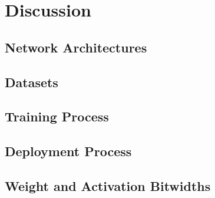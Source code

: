 \chapter{Discussion} %

\label{Chapter8} %



\section{Network Architectures}


\section{Datasets}


\section{Training Process}

\section{Deployment Process}


\section{Weight and Activation Bitwidths}
